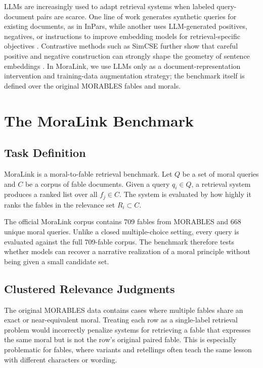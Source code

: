 \documentclass[11pt]{article}
\begin{document}
LLMs are increasingly used to adapt retrieval systems when labeled query-document pairs are scarce. One line of work generates synthetic queries for existing documents, as in InPars, while another uses LLM-generated positives, negatives, or instructions to improve embedding models for retrieval-specific objectives
\citep{bonifacio2022inpars,wang2024improving}. Contrastive methods such as SimCSE further show that careful positive and negative construction can strongly shape the geometry of sentence embeddings \citep{gao2021simcse}. In MoraLink, we use LLMs only as a document-representation intervention and training-data augmentation strategy; the benchmark itself is defined over the original MORABLES fables and morals.

\section{The MoraLink Benchmark}
\label{sec:benchmark}

\subsection{Task Definition}
MoraLink is a moral-to-fable retrieval benchmark. Let $Q$ be a set of moral
queries and $C$ be a corpus of fable documents. Given a query $q_i \in Q$, a
retrieval system produces a ranked list over all $f_j \in C$. The system is
evaluated by how highly it ranks the fables in the relevance set $R_i \subset C$.

The official MoraLink corpus contains 709 fables from MORABLES and 668 unique
moral queries. Unlike a closed multiple-choice setting, every query is evaluated
against the full 709-fable corpus. The benchmark therefore tests whether models
can recover a narrative realization of a moral principle without being given a
small candidate set.

\subsection{Clustered Relevance Judgments}
The original MORABLES data contains cases where multiple fables share an exact
or near-equivalent moral. Treating each row as a single-label retrieval problem
would incorrectly penalize systems for retrieving a fable that expresses the
same moral but is not the row's original paired fable. This is especially
problematic for fables, where variants and retellings often teach the same
lesson with different characters or wording.
\end{document}
